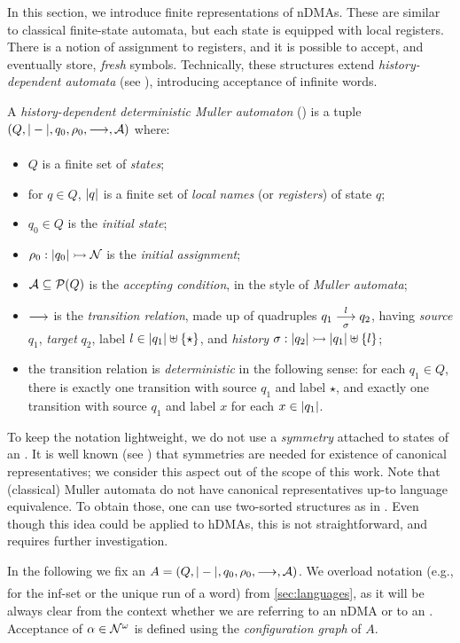 
In this section, we introduce finite representations of nDMAs. These are similar to classical finite-state automata, but each state is equipped with local registers. There is a notion of assignment to registers, and it is possible to accept, and eventually store, \emph{fresh} symbols. Technically, these structures extend \emph{history-dependent automata} (see \cite{Pistore99}), introducing acceptance of infinite words.

\begin{definition}\label{def:hdma}
 A \emph{history-dependent deterministic Muller automaton} (\hdma) is a tuple $(Q,|-|,q_0,\rho_0,\overset{}{\underset{}{\longrightarrow}},\mathcal{A})$
 where:
 \begin{itemize}
  \item $Q$ is a finite set of \emph{states};
  \item for $q \in Q$, $|q|$ is a finite set of \emph{local names} (or \emph{registers}) of state $q$;
  \item $q_0 \in Q$ is the \emph{initial state};
  \item $\rho_0 : |q_0| \rightarrowtail \mathcal{N}$ is the \emph{initial assignment};
  \item $\mathcal{A} \subseteq \mathcal{P}(Q)$ is the \emph{accepting condition}, in the style of \emph{Muller automata};
  \item $\overset{}{\underset{}{\longrightarrow}}$ is the \emph{transition relation}, made up of quadruples $q_1 \overset{l}{\underset{\sigma}{\longrightarrow}} q_2$, having \emph{source} $q_1$, \emph{target} $q_2$, label $l \in |q_1| \uplus \{\star\}$, and \emph{history} $\sigma : |q_2| \rightarrowtail |q_1| \uplus \{l\}$;
  \item the transition relation is \emph{deterministic} in the following sense: for each $q_1 \in Q$,   there is exactly one transition with source $q_1$ and label $\star$, and exactly one transition with source $q_1$ and label $x$ for each $x \in |q_1|$.
 \end{itemize}
\end{definition}
%

\begin{remark}
To keep the notation lightweight, we do not use a \emph{symmetry} attached to states of an \hdma. It is well known (see \cite{MontanariP05}) that symmetries are needed for existence of canonical representatives; we consider this aspect out of the scope of this work. Note that (classical) Muller automata do not have canonical representatives up-to language equivalence. To obtain those, one can use two-sorted structures as in \cite{CV12}. Even though this idea could be applied to hDMAs, this is not straightforward, and requires further investigation.
\label{rem:no-symmetry}
\end{remark}
%
In the following we fix an \hdma{} $A = (Q,|-|,q_0,\rho_0,\overset{}{\underset{}{\longrightarrow}},\mathcal{A})$. We overload notation (e.g., for the inf-set or the unique run of a word) from \cref{sec:languages}, as it will be always clear from the context whether we are referring to an nDMA or to an \hdma. Acceptance of $\alpha \in \mathcal{N}^\omega$ is defined using the \emph{configuration graph} of $A$.

